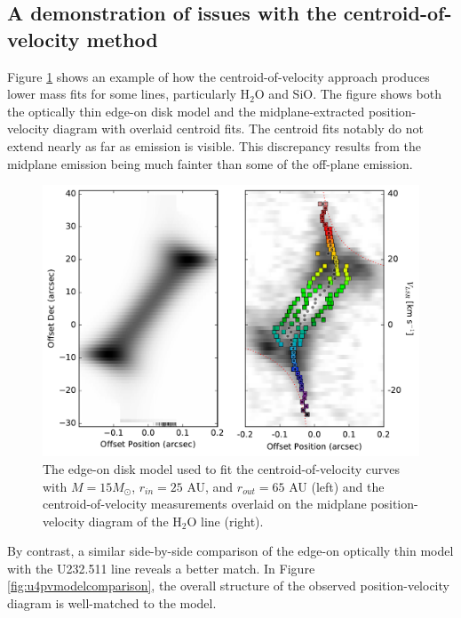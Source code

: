 \documentclass[twocolumn]{aastex61}
\newcommand{\msun}{\ensuremath{M_{\odot}}\xspace}			%
\newcommand{\water}{H$_{2}$O\xspace}		%
\begin{document}
\subsection{A demonstration of issues with the centroid-of-velocity method}
Figure \ref{fig:h2opvfailuremode} shows an example of how the
centroid-of-velocity approach produces lower mass fits for some lines,
particularly \water and SiO.  The figure shows both the optically thin edge-on
disk model and the midplane-extracted position-velocity diagram with overlaid
centroid fits.  The centroid fits notably do not extend nearly as far as
emission is visible.  This discrepancy results from the midplane emission being
much fainter than some of the off-plane emission.


\begin{figure}[!htp]
\includegraphics[scale=1,width=6in]{figures/H2Ov2=1_5(5,0)-6(4,3)_pp_pv_plots_fittedmodel_15msun_withavgs_comparepv.pdf}
\caption{The edge-on disk model used to fit the centroid-of-velocity curves with
$M=15 \msun$, $r_{in}=25$ AU, and $r_{out}=65$ AU (left) and the centroid-of-velocity measurements
overlaid on the midplane position-velocity diagram of the \water line (right).}
\label{fig:h2opvfailuremode}
\end{figure}


By contrast, a similar side-by-side comparison of the edge-on optically thin
model with the U232.511 line reveals a better match.  In Figure
\ref{fig:u4pvmodelcomparison}, the overall structure of the observed
position-velocity diagram is well-matched to the model.

\end{document}
